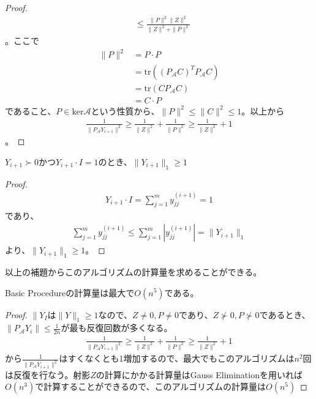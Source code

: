 \begin{proof}
\begin{align*}
                                  & \leq \frac{\|P\|^2 \|Z\|^2}{\|Z\|^2 + \|P\|^2}
  \end{align*}
  。ここで
  \begin{align*}
    \|P\|^2 & = P \cdot P \\
            & = \mathrm{tr}((P_\mathcal{A} C)^T P_\mathcal{A} C)\\
            & = \mathrm{tr}(C P_\mathcal{A} C) \\
            & = C \cdot P
  \end{align*}
  であること、$P \in \mathrm{ker} \mathcal{A}$という性質から、$\|P\|^2 \leq \|C\|^2 \leq 1$。以上から
  \begin{align*}
    \frac{1}{\|P_\mathcal{A} Y_{i + 1}\|^2} \geq \frac{1}{\|Z\|^2} + \frac{1}{\|P\|^2} \geq \frac{1}{\|Z\|^2} + 1
  \end{align*}
  。
\end{proof}

\begin{lemma*}
  $Y_{i + 1} \succ 0$かつ$Y_{i + 1} \cdot I = 1$のとき、$\|Y_{i + 1}\|_1 \geq 1$
\end{lemma*}
\begin{proof}
  \begin{align*}
    Y_{i + 1} \cdot I = \displaystyle{\sum_{j = 1}^m y_{j j}^{(i + 1)}} = 1
  \end{align*}
  であり、
  \begin{align*}
    \displaystyle{\sum_{j = 1}^m y_{j j}^{(i + 1)}} \leq \displaystyle{\sum_{j = 1}^m |y_{j j}^{(i + 1)}|} = \|Y_{i + 1}\|_1
  \end{align*}
  より、$\|Y_{i + 1}\|_1 \geq 1$。
\end{proof}

以上の補題からこのアルゴリズムの計算量を求めることができる。
\begin{theorem} \label{BasicProcedureOrder}
  Basic Procedureの計算量は最大で$O (n^5)$である。
\end{theorem}
\begin{proof}
  $\|Y_I$は$\|Y\|_1 \geq 1$なので、$Z \not= 0, P \not= 0$であり、$Z \not\succ 0, P \not\succ 0$であるとき、$\|P_\mathcal{A} Y_i\| \leq \displaystyle{\frac{1}{2 n}}$が最も反復回数が多くなる。
  \begin{align*}
    \frac{1}{\|P_\mathcal{A} Y_{i + 1}\|^2} \geq \frac{1}{\|Z\|^2} + \frac{1}{\|P\|^2} \geq \frac{1}{\|Z\|^2} + 1
  \end{align*}
  から$\displaystyle{\frac{1}{\|P_\mathcal{A} Y_{i + 1}\|^2}}$はすくなくとも1増加するので、最大でもこのアルゴリズムは$n^2$回は反復を行なう。射影$Z$の計算にかかる計算量はGauss Eliminationを用いれば$O (n^3)$で計算することができるので、このアルゴリズムの計算量は$O(n^5)$
\end{proof}

